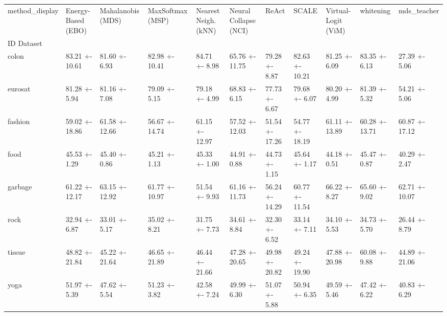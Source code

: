 \begin{tabular}{lllllllllll}
\toprule
method_display & Energy-Based (EBO) & Mahalanobis (MDS) & MaxSoftmax (MSP) & Nearest Neigh. (kNN) & Neural Collapse (NCI) & ReAct & SCALE & Virtual-Logit (ViM) & whitening & mds_teacher \\
ID Dataset &  &  &  &  &  &  &  &  &  &  \\
\midrule
colon & 83.21 +- 10.61 & 81.60 +- 6.93 & 82.98 +- 10.41 & 84.71 +- 8.98 & 65.76 +- 11.75 & 79.28 +- 8.87 & 82.63 +- 10.21 & 81.25 +- 6.09 & 83.35 +- 6.13 & 27.39 +- 5.06 \\
eurosat & 81.28 +- 5.94 & 81.16 +- 7.08 & 79.09 +- 5.15 & 79.18 +- 4.99 & 68.83 +- 6.15 & 77.73 +- 6.67 & 79.68 +- 6.07 & 80.20 +- 4.99 & 81.39 +- 5.32 & 54.21 +- 5.06 \\
fashion & 59.02 +- 18.86 & 61.58 +- 12.66 & 56.67 +- 14.74 & 61.15 +- 12.97 & 57.52 +- 12.03 & 51.54 +- 17.26 & 54.77 +- 18.19 & 61.11 +- 13.89 & 60.28 +- 13.71 & 60.87 +- 17.12 \\
food & 45.53 +- 1.29 & 45.40 +- 0.86 & 45.21 +- 1.13 & 45.33 +- 1.00 & 44.91 +- 0.88 & 44.73 +- 1.15 & 45.64 +- 1.17 & 44.18 +- 0.51 & 45.47 +- 0.87 & 40.29 +- 2.47 \\
garbage & 61.22 +- 12.17 & 63.15 +- 12.92 & 61.77 +- 10.97 & 51.54 +- 9.93 & 61.16 +- 11.73 & 56.24 +- 14.29 & 60.77 +- 11.54 & 66.22 +- 8.27 & 65.60 +- 9.02 & 62.71 +- 10.07 \\
rock & 32.94 +- 6.87 & 33.01 +- 5.17 & 35.02 +- 8.21 & 31.75 +- 7.73 & 34.61 +- 8.84 & 32.30 +- 6.52 & 33.14 +- 7.11 & 34.10 +- 5.53 & 34.73 +- 5.70 & 26.44 +- 8.79 \\
tissue & 48.82 +- 21.84 & 45.22 +- 21.64 & 46.65 +- 21.89 & 46.44 +- 21.66 & 47.28 +- 20.65 & 49.98 +- 20.82 & 49.24 +- 19.90 & 47.88 +- 20.98 & 60.08 +- 9.88 & 44.89 +- 21.06 \\
yoga & 51.97 +- 5.39 & 47.62 +- 5.54 & 51.23 +- 3.82 & 42.58 +- 7.24 & 49.99 +- 6.30 & 51.07 +- 5.88 & 50.94 +- 6.35 & 49.59 +- 5.46 & 47.42 +- 6.22 & 40.83 +- 6.29 \\
\bottomrule
\end{tabular}
